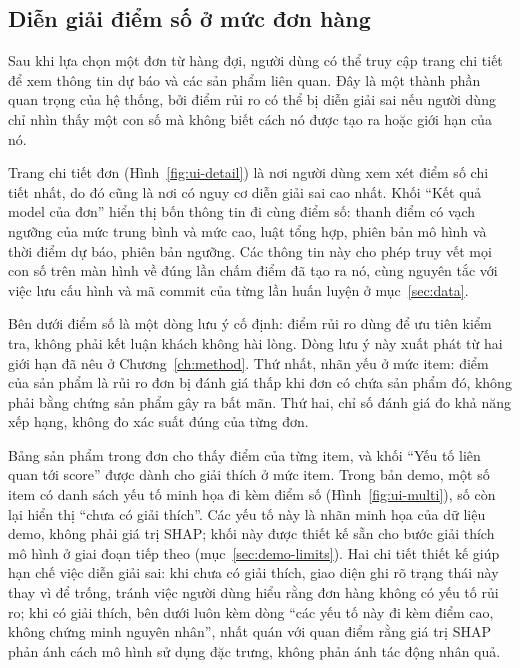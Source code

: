\documentclass[12pt,a4paper]{report}
\begin{document}
\FloatBarrier
\subsection{Diễn giải điểm số ở mức đơn hàng}

Sau khi lựa chọn một đơn từ hàng đợi, người dùng có thể truy cập trang chi tiết để xem thông tin dự báo và các sản phẩm liên quan. Đây là một thành phần quan trọng của hệ thống, bởi điểm rủi ro có thể bị diễn giải sai nếu người dùng chỉ nhìn thấy một con số mà không biết cách nó được tạo ra hoặc giới hạn của nó.

Trang chi tiết đơn (Hình~\ref{fig:ui-detail}) là nơi người dùng xem xét điểm số chi tiết nhất, do đó cũng là nơi có nguy cơ diễn giải sai cao nhất. Khối ``Kết quả model của đơn'' hiển thị bốn thông tin đi cùng điểm số: thanh điểm có vạch ngưỡng của mức trung bình và mức cao, luật tổng hợp, phiên bản mô hình và thời điểm dự báo, phiên bản ngưỡng. Các thông tin này cho phép truy vết mọi con số trên màn hình về đúng lần chấm điểm đã tạo ra nó, cùng nguyên tắc với việc lưu cấu hình và mã commit của từng lần huấn luyện ở mục~\ref{sec:data}.

Bên dưới điểm số là một dòng lưu ý cố định: điểm rủi ro dùng để ưu tiên kiểm tra, không phải kết luận khách không hài lòng. Dòng lưu ý này xuất phát từ hai giới hạn đã nêu ở Chương~\ref{ch:method}. Thứ nhất, nhãn yếu ở mức item: điểm của sản phẩm là rủi ro đơn bị đánh giá thấp khi đơn có chứa sản phẩm đó, không phải bằng chứng sản phẩm gây ra bất mãn. Thứ hai, chỉ số đánh giá đo khả năng xếp hạng, không đo xác suất đúng của từng đơn.

Bảng sản phẩm trong đơn cho thấy điểm của từng item, và khối ``Yếu tố liên quan tới score'' được dành cho giải thích ở mức item. Trong bản demo, một số item có danh sách yếu tố minh họa đi kèm điểm số (Hình~\ref{fig:ui-multi}), số còn lại hiển thị ``chưa có giải thích''. Các yếu tố này là nhãn minh họa của dữ liệu demo, không phải giá trị SHAP; khối này được thiết kế sẵn cho bước giải thích mô hình ở giai đoạn tiếp theo (mục~\ref{sec:demo-limits}). Hai chi tiết thiết kế giúp hạn chế việc diễn giải sai: khi chưa có giải thích, giao diện ghi rõ trạng thái này thay vì để trống, tránh việc người dùng hiểu rằng đơn hàng không có yếu tố rủi ro; khi có giải thích, bên dưới luôn kèm dòng ``các yếu tố này đi kèm điểm cao, không chứng minh nguyên nhân'', nhất quán với quan điểm rằng giá trị SHAP phản ánh cách mô hình sử dụng đặc trưng, không phản ánh tác động nhân quả.
\end{document}
